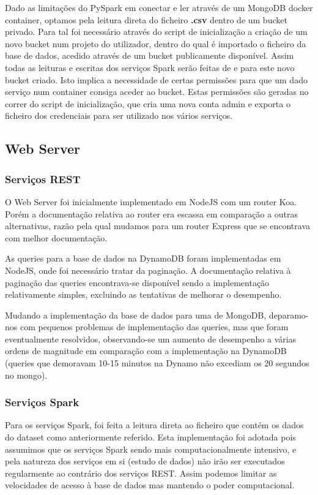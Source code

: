 \documentclass[11pt,a4paper]{article}
\begin{document}
Dado as limitações do PySpark em conectar e ler através de um MongoDB docker container, optamos pela leitura direta do ficheiro \textbf{.csv} dentro de um bucket privado. Para tal foi necessário através do script de inicialização a criação de um novo bucket num projeto do utilizador, dentro do qual é importado o ficheiro da base de dados, acedido através de um bucket publicamente disponível. Assim todas as leituras e escritas dos serviços Spark serão feitas de e para este novo bucket criado. Isto implica a necessidade de certas permissões para que um dado serviço num container consiga aceder ao bucket. Estas permissões são geradas no correr do script de inicialização, que cria uma nova conta admin e exporta o ficheiro dos credenciais para ser utilizado nos vários serviços.

\subsection{Web Server}
\subsubsection{Serviços REST}
O Web Server foi inicialmente implementado em NodeJS com um router Koa. Porém a documentação relativa ao router era escassa em comparação a outras alternativas, razão pela qual mudamos para um router Express que se encontrava com melhor documentação.

As queries para a base de dados na DynamoDB foram implementadas em NodeJS, onde foi necessário tratar da paginação. A documentação relativa à paginação das queries encontrava-se disponível sendo a implementação relativamente simples, excluindo as tentativas de melhorar o desempenho.

Mudando a implementação da base de dados para uma de MongoDB, deparamo-nos com pequenos problemas de implementação das queries, mas que foram eventualmente resolvidos, observando-se um aumento de desempenho a várias ordens de magnitude em comparação com a implementação na DynamoDB (queries que demoravam 10-15 minutos na Dynamo não excediam os 20 segundos no mongo).

\subsubsection{Serviços Spark}
Para os serviços Spark, foi feita a leitura direta ao ficheiro que contém os dados do dataset como anteriormente referido. Esta implementação foi adotada pois assumimos que os serviços Spark sendo mais computacionalmente intensivo, e pela natureza dos serviços em si (estudo de dados) não irão ser executados regularmente ao contrário dos serviços REST. Assim podemos limitar as velocidades de acesso à base de dados mas mantendo o poder computacional.
\end{document}
